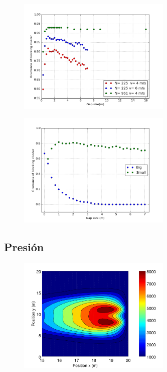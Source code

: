 \begin{figure}[H]
    \centering
    \includegraphics[height=5.5cm]{figuras/proba_vsgap_small_all.png}
    \caption[width=5cm]{\centering\textit{}}
    \label{sintesis}
\end{figure}

\begin{figure}[H]
    \centering
    \includegraphics[height=5.5cm]{figuras/proba_vsgap_v4_big_small.png}
    \caption[width=5cm]{\centering\textit{}}
    \label{sintesis}
\end{figure}




\subsection{Presión}

\begin{figure}[H]
    \centering
    \includegraphics[height=5.5cm]{figuras/press_225p_v4_g0.png}
    \caption[width=5cm]{\centering\textit{}}
    \label{sintesis}
\end{figure}

